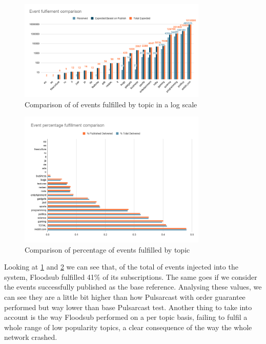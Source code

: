 \begin{figure}[!htb]
  \centering
  \includegraphics[width=0.8\textwidth]{img/graph-floodsub-event-fulfillment-comparison.png}
  \caption{Comparison of of events fulfilled by topic in a log scale}
  \label{fig:graph-floodsub-event-fulfillment-comparison}
\end{figure}

\begin{figure}[!htb]
  \centering
  \includegraphics[width=0.8\textwidth]{img/graph-floodsub-event-percentage-fulfillment-comparison.png}
  \caption{Comparison of percentage of events fulfilled by topic}
  \label{fig:graph-floodsub-event-percentage-fulfillment-comparison}
\end{figure}

Looking at \ref{fig:graph-floodsub-event-fulfillment-comparison} and
\ref{fig:graph-floodsub-event-percentage-fulfillment-comparison} we can see
that, of the total of events injected into the system, Floodsub fulfilled 41\%
of its subscriptions. The same goes if we consider the events successfully
published as the base reference. Analysing these values, we can see they are a
little bit higher than how Pulsarcast with order guarantee performed but way
lower than base Pulsarcast test. Another thing to take into account is the way
Floodsub performed on a per topic basis, failing to fulfil a  whole range of
low popularity topics, a clear consequence of the way the whole network
crashed.

